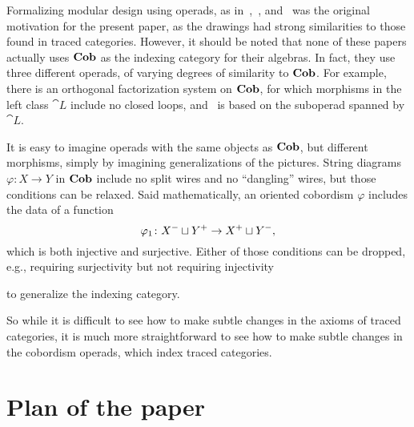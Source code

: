 \documentclass[12pt,oneside,article,draft]{memoir}
\begin{document}
Formalizing modular design using operads, as in~\cite{Spivak},~\cite{RupelSpivak}, and~\cite{VagnerSpivakLerman} was the original motivation for the present paper, as the drawings had strong similarities to those found in traced categories.
However, it should be noted that none of these papers actually uses $\mathbf{Cob}$ as the indexing category for their algebras.
In fact, they use three different operads, of varying degrees of similarity to $\mathbf{Cob}$.
For example, there is an orthogonal factorization system on $\mathbf{Cob}$, for which morphisms in the left class $\cat{L}$ include no closed loops, and~\cite{VagnerSpivakLerman} is based on the suboperad spanned by $\cat{L}$.

It is easy to imagine operads with the same objects as $\mathbf{Cob}$, but different morphisms, simply by imagining generalizations of the pictures.
String diagrams $\varphi\colon X\to Y$ in $\mathbf{Cob}$ include no split wires and no ``dangling'' wires, but those conditions can be relaxed.
Said mathematically, an oriented cobordism $\varphi$ includes the data of a function
$$\varphi_1\colon X^-\sqcup Y^+\to X^+\sqcup Y^-,$$
which is both injective and surjective.
Either of those conditions can be dropped, e.g., requiring surjectivity but not requiring injectivity
\begin{center}
\end{center}
to generalize the indexing category.

So while it is difficult to see how to make subtle changes in the axioms of traced categories, it is much more straightforward to see how to make subtle changes in the cobordism operads, which index traced categories.


\section{Plan of the paper}
\end{document}
